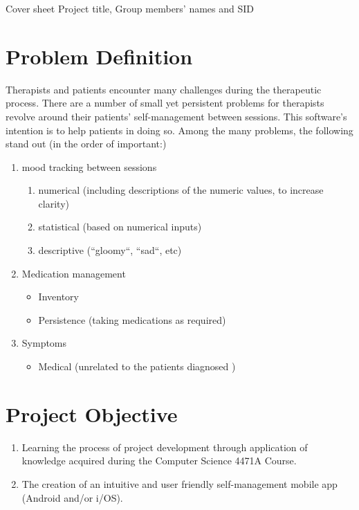 \documentclass[11pt]{article}
\begin{document}
    \maketitle
    Cover sheet {Project title, Group members' names and SID}


    \chapter{Problem Definition}\label{ch:problem-definition}
    Therapists and patients encounter many challenges during the therapeutic process.
    There are a number of small yet persistent problems for therapists revolve around their patients' self-management between sessions.
    This software's intention is to help patients in doing so.
    Among the many problems, the following stand out (in the order of important:)
    \begin{enumerate}
        \item mood tracking between sessions
        \begin{enumerate}
            \item numerical (including descriptions of the numeric values, to increase clarity)
            \item statistical (based on numerical inputs)
            \item descriptive (``gloomy``, ``sad``, etc)
        \end{enumerate}
        \item Medication management
        \begin{itemize}
            \item Inventory
            \item Persistence (taking medications as required)
        \end{itemize}
        \item Symptoms
        \begin{itemize}
            \item Medical (unrelated to the patients diagnosed )
        \end{itemize}
    \end{enumerate}


    \chapter{Project Objective}\label{ch:project-objective}

    \begin{enumerate}
        \item Learning the process of project development through application of knowledge acquired during the Computer Science 4471A Course.
        \item The creation of an intuitive and user friendly self-management mobile app (Android and/or i/OS).
    \end{enumerate}
\end{document}
